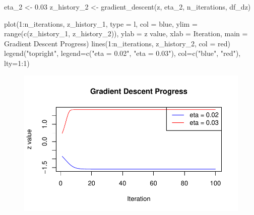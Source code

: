 \documentclass[
  letterpaper,
  DIV=11,
  numbers=noendperiod]{scrartcl}
\newenvironment{Shaded}{\begin{snugshade}}{\end{snugshade}}
\newcommand{\AttributeTok}[1]{\textcolor[rgb]{0.40,0.45,0.13}{#1}}
\newcommand{\DecValTok}[1]{\textcolor[rgb]{0.68,0.00,0.00}{#1}}
\newcommand{\FloatTok}[1]{\textcolor[rgb]{0.68,0.00,0.00}{#1}}
\newcommand{\FunctionTok}[1]{\textcolor[rgb]{0.28,0.35,0.67}{#1}}
\newcommand{\NormalTok}[1]{\textcolor[rgb]{0.00,0.23,0.31}{#1}}
\newcommand{\OtherTok}[1]{\textcolor[rgb]{0.00,0.23,0.31}{#1}}
\newcommand{\SpecialCharTok}[1]{\textcolor[rgb]{0.37,0.37,0.37}{#1}}
\newcommand{\StringTok}[1]{\textcolor[rgb]{0.13,0.47,0.30}{#1}}
\begin{document}
\begin{Shaded}
\begin{Highlighting}[]
\NormalTok{eta\_2 }\OtherTok{\textless{}{-}} \FloatTok{0.03}
\NormalTok{z\_history\_2 }\OtherTok{\textless{}{-}} \FunctionTok{gradient\_descent}\NormalTok{(z, eta\_2, n\_iterations, df\_dz)}

\FunctionTok{plot}\NormalTok{(}\DecValTok{1}\SpecialCharTok{:}\NormalTok{n\_iterations, z\_history\_1, }\AttributeTok{type =} \StringTok{\textquotesingle{}l\textquotesingle{}}\NormalTok{, }\AttributeTok{col =} \StringTok{\textquotesingle{}blue\textquotesingle{}}\NormalTok{, }\AttributeTok{ylim =} \FunctionTok{range}\NormalTok{(}\FunctionTok{c}\NormalTok{(z\_history\_1, z\_history\_2)), }\AttributeTok{ylab =} \StringTok{\textquotesingle{}z value\textquotesingle{}}\NormalTok{, }\AttributeTok{xlab =} \StringTok{\textquotesingle{}Iteration\textquotesingle{}}\NormalTok{, }\AttributeTok{main =} \StringTok{\textquotesingle{}Gradient Descent Progress\textquotesingle{}}\NormalTok{)}
\FunctionTok{lines}\NormalTok{(}\DecValTok{1}\SpecialCharTok{:}\NormalTok{n\_iterations, z\_history\_2, }\AttributeTok{col =} \StringTok{\textquotesingle{}red\textquotesingle{}}\NormalTok{)}
\FunctionTok{legend}\NormalTok{(}\StringTok{"topright"}\NormalTok{, }\AttributeTok{legend=}\FunctionTok{c}\NormalTok{(}\StringTok{"eta = 0.02"}\NormalTok{, }\StringTok{"eta = 0.03"}\NormalTok{), }\AttributeTok{col=}\FunctionTok{c}\NormalTok{(}\StringTok{"blue"}\NormalTok{, }\StringTok{"red"}\NormalTok{), }\AttributeTok{lty=}\DecValTok{1}\SpecialCharTok{:}\DecValTok{1}\NormalTok{)}
\end{Highlighting}
\end{Shaded}

\begin{figure}[H]

{\centering \includegraphics{hm4_files/figure-pdf/unnamed-chunk-9-1.pdf}

}

\end{figure}
\end{document}
